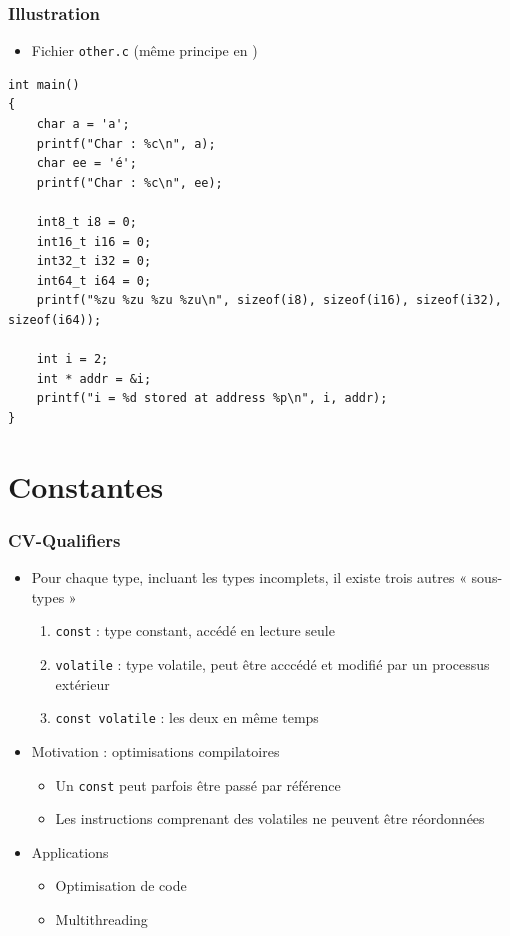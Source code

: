 \begin{frame}[containsverbatim]
\frametitle{Illustration}
\begin{itemize}
\item Fichier \texttt{other.c} (même principe en \cpp)
\end{itemize}
\begin{lstlisting}
int main()
{       
    char a = 'a';
    printf("Char : %c\n", a);
    char ee = 'é';
    printf("Char : %c\n", ee);    
    
    int8_t i8 = 0;
    int16_t i16 = 0;
    int32_t i32 = 0;
    int64_t i64 = 0;
    printf("%zu %zu %zu %zu\n", sizeof(i8), sizeof(i16), sizeof(i32), sizeof(i64));
    
    int i = 2;
    int * addr = &i;
    printf("i = %d stored at address %p\n", i, addr);
}
\end{lstlisting}
\end{frame}

\section{Constantes}

\begin{frame}
\frametitle{CV-Qualifiers}
\begin{itemize}[<+->]
\item Pour chaque type, incluant les types incomplets, il existe trois autres « sous-types »
	\begin{enumerate}
	\item \lstinline|const| : type constant, accédé en lecture seule
	\item \lstinline|volatile| : type volatile, peut être acccédé et modifié par un processus extérieur
	\item \lstinline|const volatile| : les deux en même temps
	\end{enumerate}
\item Motivation : optimisations compilatoires
	\begin{itemize}
	\item Un \lstinline|const| peut parfois être passé par référence
	\item Les instructions comprenant des volatiles ne peuvent être réordonnées
	\end{itemize}
\item Applications
	\begin{itemize}
	\item Optimisation de code
	\item Multithreading
	\end{itemize}
\end{itemize}
\end{frame}

